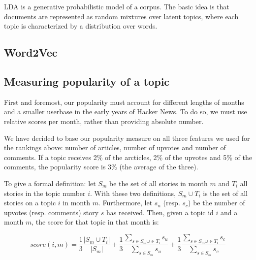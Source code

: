 LDA is a generative probabilistic model of a corpus. The basic idea is that documents are represented as random mixtures over latent topics, where each topic is characterized by a distribution over words.\cite{blei2003latent}

\subsection{Word2Vec}


\subsection{Measuring popularity of a topic}
First and foremost, our popularity must account for different lengths of months and a smaller userbase in the early years of Hacker News. To do so, we must use relative scores per month, rather than providing absolute number.

We have decided to base our popularity measure on all three features we used for the rankings above: number of articles, number of upvotes and number of comments. If a topic receives 2\% of the arcticles, 2\% of the upvotes and 5\% of the comments, the popularity score is 3\% (the average of the three).

To give a formal definition: let $S_m$ be the set of all stories in month $m$ and $T_i$ all stories in the topic number $i$. With these two definitions, $S_m \cup T_i$ is the set of all stories on a topic $i$ in month $m$. Furthermore, let $s_u$ (resp. $s_c$) be the number of upvotes (resp. comments) story $s$ has received. Then, given a topic id $i$ and a month $m$, the score for that topic in that month is:

$$
	score(i, m) = 
		\frac{1}{3} \frac{|S_m \cup T_i|}{|S_m|} + 
		\frac{1}{3} \frac{\sum_{s \in S_m \cup \in T_i} s_u}{\sum_{s \in S_m} s_u}  + 
		\frac{1}{3} \frac{\sum_{s \in S_m \cup \in T_i} s_c}{\sum_{s \in S_m} s_c}
$$
